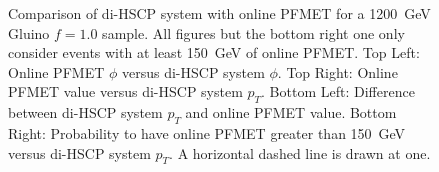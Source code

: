 \begin{figure}
\begin{center}
      \caption[Comparison of di-HSCP system $\phi$ and \pt\ with online PFMET for a 1200~GeV 
Gluino $f=1.0$ sample in events with at least 150~GeV of online PFMET.]
        {Comparison of di-HSCP system with online PFMET for a 1200~GeV Gluino $f=1.0$ sample. All figures but the bottom right one only consider 
	  events with at least 150~GeV of online PFMET. 
         Top Left: Online PFMET $\phi$ versus di-HSCP system $\phi.$ Top Right: Online PFMET value versus di-HSCP system $p_T$. 
         Bottom Left: Difference between di-HSCP system $p_T$ and online PFMET value.
         Bottom Right: Probability to have online PFMET greater than 150~GeV versus di-HSCP system $p_T$. A horizontal dashed line is drawn at one.
        }
      \label{fig:SystPtTrigger}
  \end{center}
\end{figure}

